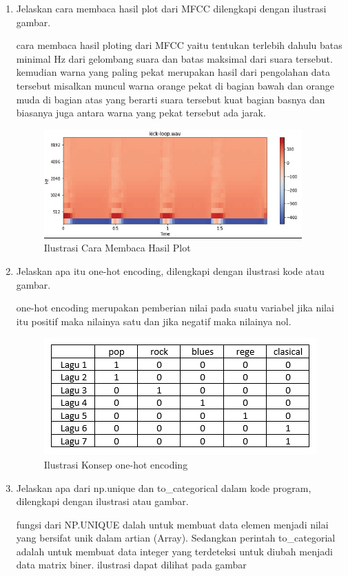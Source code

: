 \begin{enumerate}
\item Jelaskan cara membaca hasil plot dari MFCC dilengkapi dengan ilustrasi gambar. \par
cara membaca hasil ploting dari MFCC yaitu tentukan terlebih dahulu batas minimal Hz dari 
gelombang suara dan batas maksimal dari suara tersebut. kemudian warna yang paling pekat merupakan hasil 
dari pengolahan data tersebut misalkan muncul warna orange pekat di bagian bawah dan orange muda di bagian atas
yang berarti suara tersebut kuat bagian basnya dan biasanya juga antara warna yang pekat tersebut ada jarak.

\begin{figure}[ht]
\centering
\includegraphics[scale=0.3]{figures/1174002/chapter6/1,5.PNG}
\caption{Ilustrasi Cara Membaca Hasil Plot}
\label{contoh}
\end{figure}

\item Jelaskan apa itu one-hot encoding, dilengkapi dengan ilustrasi kode atau gambar.\par
one-hot encoding merupakan pemberian nilai pada suatu variabel jika nilai itu positif 
maka nilainya satu dan jika negatif maka nilainya nol.

\begin{figure}[ht]
\centering
\includegraphics[scale=0.3]{figures/1174002/chapter6/1,6.PNG}
\caption{Ilustrasi Konsep one-hot encoding}
\label{contoh}
\end{figure}

\item Jelaskan apa dari np.unique dan to\_categorical dalam kode program, dilengkapi dengan ilustrasi atau gambar.\par
fungsi dari NP.UNIQUE dalah untuk membuat data elemen menjadi nilai yang bersifat unik dalam artian (Array). Sedangkan perintah to\_categorial adalah untuk
membuat data integer yang terdeteksi untuk diubah menjadi data matrix biner. ilustrasi dapat dilihat pada gambar
           

\end{enumerate}
